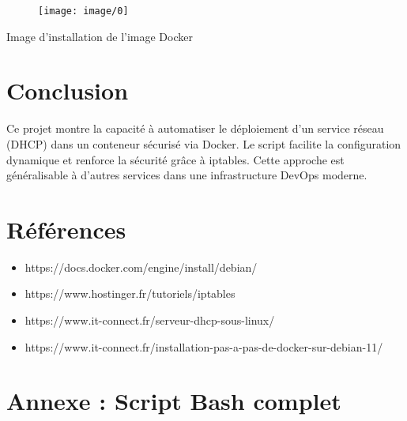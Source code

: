 \begin{figure}[h!]
	\centering
	\texttt{[image: image/0]}
	\label{fig:0}
\end{figure}
\begin{center}
	Image d’installation de l’image Docker
\end{center}
\section{Conclusion}
	Ce projet montre la capacité à automatiser le déploiement d’un service réseau (DHCP) dans un conteneur sécurisé via Docker. Le script facilite la configuration dynamique et renforce la sécurité grâce à iptables. Cette approche est généralisable à d’autres services dans une infrastructure DevOps moderne.
\newpage	
\section*{Références}
	\begin{itemize}
		\item {https://docs.docker.com/engine/install/debian/}
		\item {https://www.hostinger.fr/tutoriels/iptables}
		\item {https://www.it-connect.fr/serveur-dhcp-sous-linux/}
		\item {https://www.it-connect.fr/installation-pas-a-pas-de-docker-sur-debian-11/}
	\end{itemize}
	\newpage
	\section*{Annexe : Script Bash complet}
	

